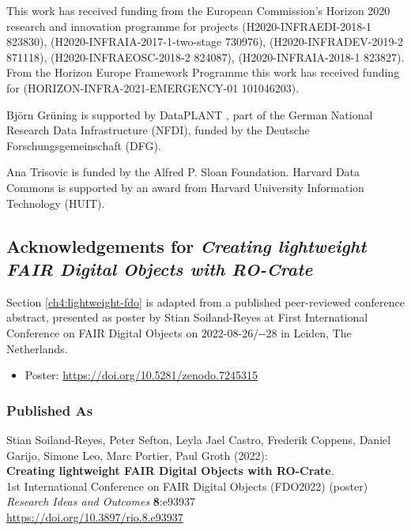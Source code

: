 This work has received funding from the European Commission's Horizon
2020 research and innovation programme for projects
(H2020-INFRAEDI-2018-1 823830),
(H2020-INFRAIA-2017-1-two-stage 730976),
(H2020-INFRADEV-2019-2 871118),
(H2020-INFRAEOSC-2018-2 824087),
(H2020-INFRAIA-2018-1 823827). From the Horizon Europe Framework
Programme this work has received funding for
(HORIZON-INFRA-2021-EMERGENCY-01 101046203).

Björn Grüning is supported by DataPLANT
, part of the German National Research Data Infrastructure (NFDI), funded by the Deutsche Forschungsgemeinschaft (DFG).

Ana Trisovic is funded by the Alfred P. Sloan Foundation.
Harvard Data Commons is supported by an award from Harvard University
Information Technology (HUIT).




\subsection{Acknowledgements for \textit{Creating lightweight FAIR Digital Objects with RO-Crate}}\label{ch11:lightweight}

Section \vref{ch4:lightweight-fdo} is adapted from a published peer-reviewed conference abstract,
presented as poster by Stian Soiland-Reyes at 
First International Conference on FAIR Digital Objects 
 on
2022-08-26/-{}-28 in Leiden, The Netherlands. 

\begin{itemize}
\item
  Poster: \url{https://doi.org/10.5281/zenodo.7245315}
\end{itemize}

\subsubsection*{Published As}
Stian Soiland-Reyes, Peter Sefton, Leyla Jael Castro, Frederik Coppens,
Daniel Garijo, Simone Leo, Marc Portier, Paul Groth (2022):\\
\textbf{Creating lightweight FAIR Digital Objects with RO-Crate}.\\
1st International Conference on FAIR Digital Objects (FDO2022) (poster)\\
\emph{Research Ideas and Outcomes} \textbf{8}:e93937\\
\url{https://doi.org/10.3897/rio.8.e93937}


